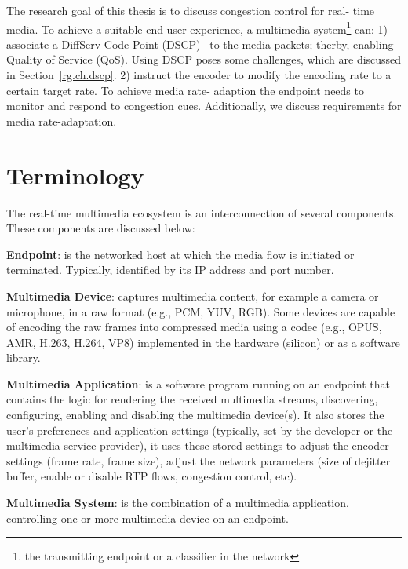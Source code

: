 
The research goal of this thesis is to discuss congestion control for real-
time media. To achieve a suitable end-user experience, a multimedia
system\footnote{the transmitting endpoint or a classifier in the network} can:
1) associate a DiffServ Code Point (DSCP)~\cite{rfc2474} to the media packets;
therby, enabling Quality of Service (QoS). Using DSCP poses some challenges,
which are discussed in Section~\ref{rg.ch.dscp}. 2) instruct the encoder to
modify the encoding rate to a certain target rate. To achieve media rate-
adaption the endpoint needs to monitor and respond to congestion cues.
Additionally, we  discuss requirements for media rate-adaptation.


\section{Terminology}

The real-time multimedia ecosystem is an interconnection of several
components. These components are discussed below:

\textbf{Endpoint}: is the networked host at which the media flow is initiated
or terminated. Typically, identified by its IP address and port number.


\textbf{Multimedia Device}: captures multimedia content, for example a camera
or microphone, in a raw format (e.g., PCM, YUV, RGB). Some devices are capable
of encoding the raw frames into compressed media using a codec (e.g., OPUS,
AMR, H.263, H.264, VP8) implemented in the hardware (silicon) or as a software
library.


\textbf{Multimedia Application}: is a software program running on an endpoint
that contains the logic for rendering the received multimedia streams,
discovering, configuring, enabling and disabling the multimedia device(s). It
also stores the user's preferences and application settings (typically, set by
the developer or the multimedia service provider), it uses these stored
settings to adjust the encoder settings (frame rate, frame size), adjust the
network parameters (size of dejitter buffer, enable or disable RTP flows,
congestion control, etc).

\textbf{Multimedia System}: is the combination of a multimedia application,
controlling one or more multimedia device on an endpoint.

